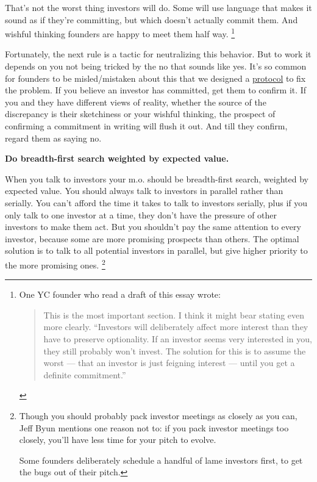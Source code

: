 \documentclass[12pt]{book}
\begin{document}
That's not the worst thing investors will do. Some will use language
that makes it sound as if they're committing, but which doesn't actually
commit them. And wishful thinking founders are happy to meet them half
way. \footnote{One YC founder who read a draft of this essay wrote:

\begin{quote}
This is the most important section. I think it might bear stating even
more clearly. ``Investors will deliberately affect more interest than
they have to preserve optionality. If an investor seems very interested
in you, they still probably won't invest. The solution for this is to
assume the worst --- that an investor is just feigning interest ---
until you get a definite commitment.''
\end{quote}}

Fortunately, the next rule is a tactic for neutralizing this behavior.
But to work it depends on you not being tricked by the no that sounds
like yes. It's so common for founders to be misled/mistaken about this
that we designed a \href{http://ycombinator.com/hdp.html}{protocol} to
fix the problem. If you believe an investor has committed, get them to
confirm it. If you and they have different views of reality, whether the
source of the discrepancy is their sketchiness or your wishful thinking,
the prospect of confirming a commitment in writing will flush it out.
And till they confirm, regard them as saying no.

\textbf{Do breadth-first search weighted by expected value.}

When you talk to investors your m.o. should be breadth-first search,
weighted by expected value. You should always talk to investors in
parallel rather than serially. You can't afford the time it takes to
talk to investors serially, plus if you only talk to one investor at a
time, they don't have the pressure of other investors to make them act.
But you shouldn't pay the same attention to every investor, because some
are more promising prospects than others. The optimal solution is to
talk to all potential investors in parallel, but give higher priority to
the more promising ones. \footnote{Though you should probably pack investor meetings as closely as
you can, Jeff Byun mentions one reason not to: if you pack investor
meetings too closely, you'll have less time for your pitch to evolve.

Some founders deliberately schedule a handful of lame investors first,
to get the bugs out of their pitch.}
\end{document}
